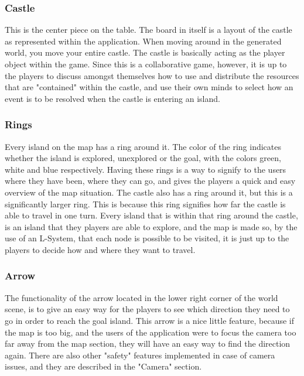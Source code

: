 \subsubsection{Castle}
	
This is the center piece on the table. The board in itself is a layout of the castle as represented within the application.
When moving around in the generated world, you move your entire castle. The castle is basically acting as the player object within the game. Since this is a collaborative game, however, it is up to the players to discuss amongst themselves how to use and distribute the resources that are "contained" within the castle, and use their own minds to select how an event is to be resolved when the castle is entering an island.

\subsubsection{Rings} 

Every island on the map has a ring around it. The color of the ring indicates whether the island is explored, unexplored or the goal, with the colors green, white and blue respectively. Having these rings is a way to signify to the users where they have been, where they can go, and gives the players a quick and easy overview of the map situation.
The castle also has a ring around it, but this is a significantly larger ring. This is because this ring signifies how far the castle is able to travel in one turn. Every island that is within that ring around the castle, is an island that they players are able to explore, and the map is made so, by the use of an L-System, that each node is possible to be visited, it is just up to the players to decide how and where they want to travel.

\subsubsection{Arrow} 

The functionality of the arrow located in the lower right corner of the world scene, is to give an easy way for the players to see which direction they need to go in order to reach the goal island.
This arrow is a nice little feature, because if the map is too big, and the users of the application were to focus the camera too far away from the map section, they will have an easy way to find the direction again. There are also other "safety" features implemented in case of camera issues, and they are described in the "Camera" section.


